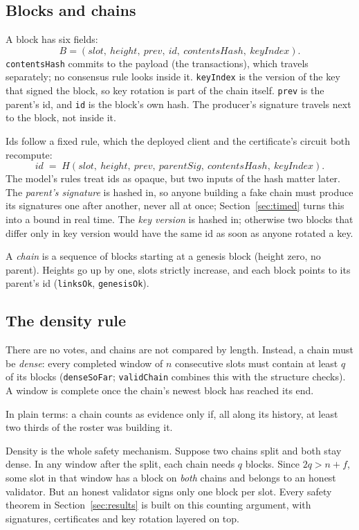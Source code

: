 \documentclass[10pt]{article}
\DeclareRobustCommand{\code}[1]{{\renewcommand{\_}{\textunderscore\allowbreak}\texttt{#1}}}
\newcommand{\quorum}{\ensuremath{q}}
\newcommand{\fmax}{\ensuremath{f}}
\begin{document}
\subsection{Blocks and chains}

A block has six fields:
\[
B = (\mathit{slot},\ \mathit{height},\ \mathit{prev},\ \mathit{id},\
\mathit{contentsHash},\ \mathit{keyIndex}).
\]
\code{contentsHash} commits to the payload (the transactions), which
travels separately; no consensus rule looks inside it. \code{keyIndex}
is the version of the key that signed the block, so key rotation is part
of the chain itself. \code{prev} is the parent's id, and \code{id} is
the block's own hash. The producer's signature travels next to the block, not inside it.

Ids follow a fixed rule, which the deployed client and the
certificate's circuit both recompute:
\[
\mathit{id} \;=\; H(\mathit{slot},\ \mathit{height},\ \mathit{prev},\
\mathit{parentSig},\ \mathit{contentsHash},\ \mathit{keyIndex}).
\]
The model's rules treat ids as opaque, but two inputs of the hash
matter later. The \emph{parent's signature} is hashed in, so anyone
building a fake chain must produce its signatures one after another,
never all at once; Section~\ref{sec:timed} turns this into a bound in
real time. The \emph{key version} is hashed in; otherwise two blocks
that differ only in key version would have the same id as soon as anyone
rotated a key.

A \emph{chain} is a sequence of blocks starting at a genesis block
(height zero, no parent). Heights go up by one, slots strictly increase,
and each block points to its parent's id (\code{linksOk},
\code{genesisOk}).

\subsection{The density rule}

There are no votes, and chains are not compared by length. Instead, a
chain must be \emph{dense}: every completed window of $n$ consecutive
slots must contain at least $\quorum$ of its blocks (\code{denseSoFar};
\code{validChain} combines this with the structure checks). A window is
complete once the chain's newest block has reached its end.

In plain terms: a chain counts as evidence only if, all along its
history, at least two thirds of the roster was building it.

Density is the whole safety mechanism. Suppose two chains split and both
stay dense. In any window after the split, each chain needs $\quorum$
blocks. Since $2\quorum > n + \fmax$, some slot in that window has a
block on \emph{both} chains and belongs to an honest validator. But an
honest validator signs only one block per slot. Every safety theorem in
Section~\ref{sec:results} is built on this counting argument, with
signatures, certificates and key rotation layered on top.
\end{document}
